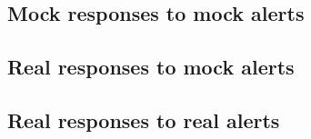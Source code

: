 \subsection{Mock responses to mock alerts}\label{subsec:MockResponseMockAlert}

\subsection{Real responses to mock alerts}\label{subsec:RealResponseMockAlert}

\subsection{Real responses to real alerts}\label{subsec:RealResponseRealAlert}